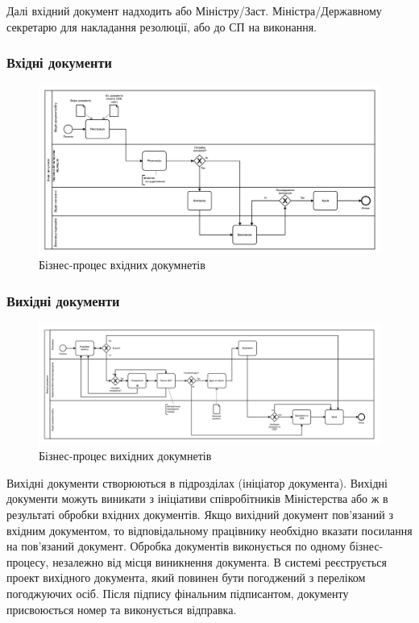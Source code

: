 Далі вхідний документ надходить або Міністру/Заст. Міністра/Державному
секретарю для накладання резолюції, або до СП на виконання.

\subsubsection{Вхідні документи}

\begin{figure}[!htbp]
\centerline{\includegraphics[scale=0.27]{inputDoc.png}}
\caption{Бізнес-процес вхідних докумнетів}
\end{figure}

\subsubsection{Вихідні документи}

\begin{figure}[!htbp]
\centerline{\includegraphics[scale=0.27]{outputDoc.png}}
\caption{Бізнес-процес вихідних докумнетів}
\end{figure}

Вихідні документи створюються в підрозділах (ініціатор документа).
Вихідні документи можуть виникати з ініціативи співробітників
Міністерства або ж в результаті обробки вхідних документів.
Якщо вихідний документ пов'язаний з вхідним документом, то
відповідальному працівнику необхідно вказати посилання на
пов'язаний документ. Обробка документів виконується по
одному бізнес-процесу, незалежно від місця виникнення документа.
В системі реєструється проект вихідного документа,
який повинен бути погоджений з переліком погоджуючих осіб.
Після підпису фінальним підписантом, документу присвоюється
номер та виконується відправка.


